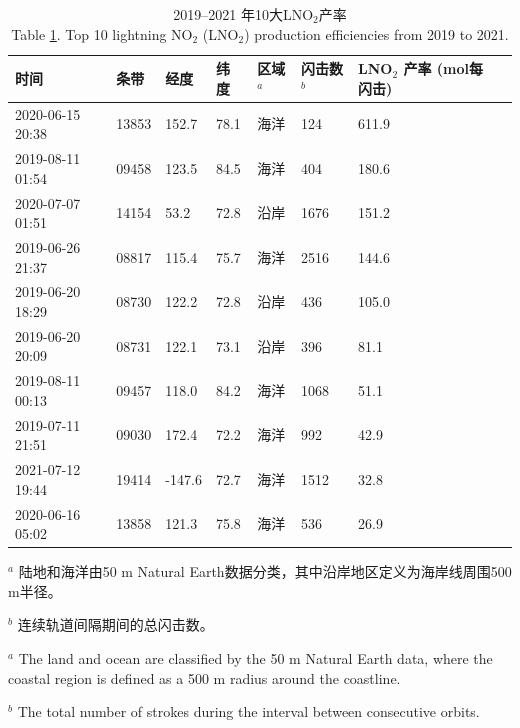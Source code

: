 \begin{table}[H]
\centering
\caption{2019--2021 年10大LNO$_2$产率 \\
Table \ref{table:arctic_pe_lno2}.
Top 10 lightning NO$_2$ (LNO$_2$) production efficiencies from 2019 to 2021.}
\label{table:arctic_pe_lno2}
\footnotesize
{\centering
\begin{tabular}{llllllll}
\hline
时间 &       条带 &   经度 &   纬度 &
区域$^a$ &
闪击数$^b$  & \shortstack{LNO$_2$ 产率 \\ (mol每闪击)} \\
\hline
2020-06-15 20:38 &  13853 &      152.7 &      78.1 &       海洋 &         124 &    611.9 \\
2019-08-11 01:54 &  09458 &      123.5 &      84.5 &       海洋 &         404 &    180.6 \\
2020-07-07 01:51 &  14154 &       53.2 &      72.8 &       沿岸 &        1676 &    151.2 \\
2019-06-26 21:37 &  08817 &      115.4 &      75.7 &       海洋 &        2516 &    144.6 \\
2019-06-20 18:29 &  08730 &      122.2 &      72.8 &       沿岸 &         436 &    105.0 \\
2019-06-20 20:09 &  08731 &      122.1 &      73.1 &       沿岸 &         396 &     81.1 \\
2019-08-11 00:13 &  09457 &      118.0 &      84.2 &       海洋 &        1068 &     51.1 \\
2019-07-11 21:51 &  09030 &      172.4 &      72.2 &       海洋 &         992 &     42.9 \\
2021-07-12 19:44 &  19414 &     -147.6 &      72.7 &       海洋 &        1512 &     32.8 \\
2020-06-16 05:02 &  13858 &      121.3 &      75.8 &       海洋 &         536 &     26.9 \\
\hline
\end{tabular}
\par }
\begin{tablenotes}
\linespread{1}\footnotesize
\item $^a$ 陆地和海洋由50 m Natural Earth数据分类，其中沿岸地区定义为海岸线周围500 m半径。
\item $^b$ 连续轨道间隔期间的总闪击数。
\item $^a$ The land and ocean are classified by the 50 m Natural Earth data, where the coastal region is defined as a 500 m radius around the coastline.
\item $^b$ The total number of strokes during the interval between consecutive orbits.
\end{tablenotes}
\end{table}

